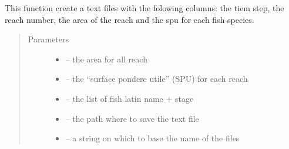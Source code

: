 \documentclass[letterpaper,10pt,english]{sphinxmanual}
\begin{document}

\begin{fulllineitems}
\label{\detokenize{index:src.calcul_hab.save_spu_txt}}
This function create a text files with the folowing columns: the tiem step, the reach number, the area of the
reach and the spu for each fish species.
\begin{quote}\begin{description}
\item[{Parameters}] \leavevmode\begin{itemize}
\item {} 
 -- the area for all reach

\item {} 
 -- the ``surface pondere utile'' (SPU) for each reach

\item {} 
 -- the list of fish latin name + stage

\item {} 
 -- the path where to save the text file

\item {} 
 -- a string on which to base the name of the files

\end{itemize}

\end{description}\end{quote}

\end{fulllineitems}

\end{document}
